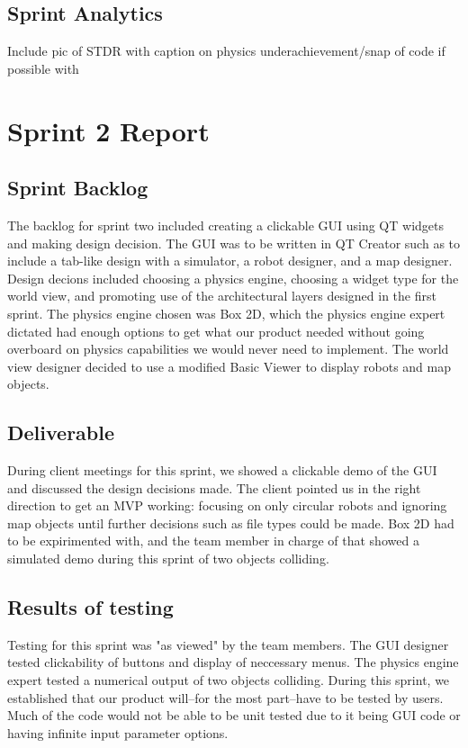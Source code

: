 \subsection{Sprint Analytics} 

Include pic of STDR with caption on physics underachievement/snap of code if possible with 


\section{Sprint 2 Report}
\subsection{Sprint Backlog}

The backlog for sprint two included creating a clickable GUI using QT widgets and making design decision. The GUI was to be written in QT Creator such as to include a tab-like design with a simulator, a robot designer, and a map designer. Design decions included choosing a physics engine, choosing a widget type for the world view, and promoting use of the architectural layers designed in the first sprint. The physics engine chosen was Box 2D, which the physics engine expert dictated had enough options to get what our product needed without going overboard on physics capabilities we would never need to implement. The world view designer decided to use a modified Basic Viewer to display robots and map objects.

\subsection{Deliverable}

During client meetings for this sprint, we showed a clickable demo of the GUI and discussed the design decisions made. The client pointed us in the right direction to get an MVP working: focusing on only circular robots and ignoring map objects until further decisions such as file types could be made. Box 2D had to be expirimented with, and the team member in charge of that showed a simulated demo during this sprint of two objects colliding. 

\subsection{Results of testing}

Testing for this sprint was "as viewed" by the team members. The GUI designer tested clickability of buttons and display of neccessary menus. The physics engine expert tested a numerical output of two objects colliding. During this sprint, we established that our product will--for the most part--have to be tested by users. Much of the code would not be able to be unit tested due to it being GUI code or having infinite input parameter options.

